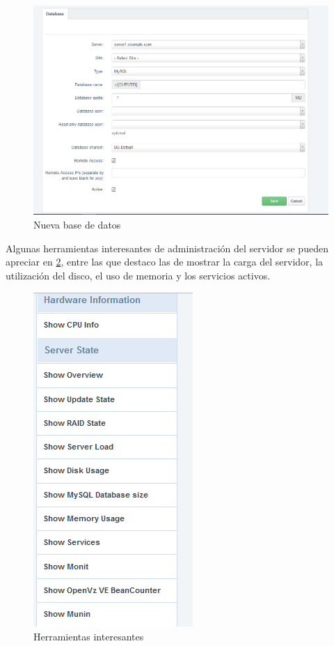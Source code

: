 \begin{figure}[H]
	\centering
	\includegraphics[scale=0.6]{creando-bd.png}
	\caption{Nueva base de datos} \label{creando-bd}
\end{figure}

Algunas herramientas interesantes de administración del servidor se pueden apreciar en \ref{herramientas-interesantes}, entre las que destaco las de mostrar la carga del servidor, la utilización del disco, el uso de memoria y los servicios activos.

\begin{figure}[H]
	\centering
	\includegraphics[scale=0.6]{herramientas-interesantes.png}
	\caption{Herramientas interesantes} \label{herramientas-interesantes}
\end{figure}

